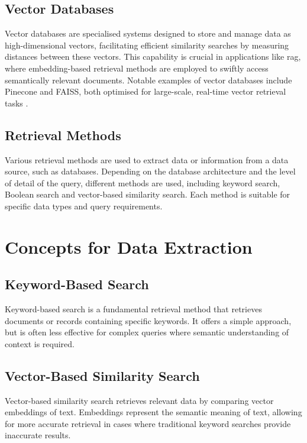 \subsection{Vector Databases}\label{sec:vector-databases}
Vector databases are specialised systems designed to store and manage data as high-dimensional vectors, facilitating efficient similarity searches by measuring distances between these vectors. 
This capability is crucial in applications like \ac{rag}, where embedding-based retrieval methods are employed to swiftly access semantically relevant documents. 
Notable examples of vector databases include Pinecone and FAISS, both optimised for large-scale, real-time vector retrieval tasks \citep{Johnson2019}.

\subsection{Retrieval Methods}\label{sec:retrieval-methods}

Various retrieval methods are used to extract data or information from a data source, such as databases. Depending on the database architecture and the level of detail of the query, different methods are used, including keyword search, Boolean search and vector-based similarity search. Each method is suitable for specific data types and query requirements.
\section{Concepts for Data Extraction}\label{sec:data-extraction-concepts}

\subsection{Keyword-Based Search}\label{sec:keyword-search}
Keyword-based search is a fundamental retrieval method that retrieves documents or records containing specific keywords. It offers a simple approach, but is often less effective for complex queries where semantic understanding of context is required.

\subsection{Vector-Based Similarity Search}\label{sec:vector-similarity-search}
Vector-based similarity search retrieves relevant data by comparing vector embeddings of text. Embeddings represent the semantic meaning of text, allowing for more accurate retrieval in cases where traditional keyword searches provide inaccurate results.

